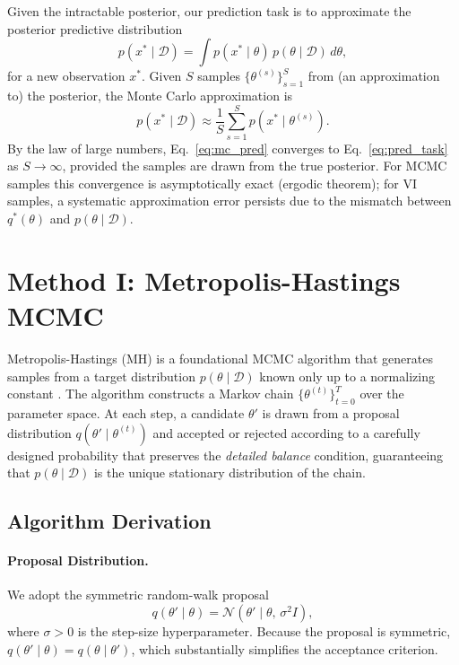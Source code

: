 \documentclass[12pt,a4paper]{article}
\newcommand{\D}{\mathcal{D}}
\newcommand{\N}{\mathcal{N}}
\begin{document}
Given the intractable posterior, our prediction task is to approximate
the posterior predictive distribution
\begin{equation}
  p(x^* \mid \D) = \int p(x^* \mid \theta)\,p(\theta \mid \D)\,d\theta,
  \label{eq:pred_task}
\end{equation}
for a new observation $x^*$.
Given $S$ samples $\{\theta^{(s)}\}_{s=1}^{S}$ from (an approximation to)
the posterior, the Monte Carlo approximation is
\begin{equation}
  p(x^* \mid \D)
  \approx \frac{1}{S}\sum_{s=1}^{S} p\!\left(x^* \mid \theta^{(s)}\right).
  \label{eq:mc_pred}
\end{equation}
By the law of large numbers, Eq.~\eqref{eq:mc_pred} converges to
Eq.~\eqref{eq:pred_task} as $S \to \infty$, provided the samples are
drawn from the true posterior.
For MCMC samples this convergence is asymptotically exact (ergodic theorem);
for VI samples, a systematic approximation error persists due to the
mismatch between $q^*(\theta)$ and $p(\theta \mid \D)$.

\section{Method I: Metropolis-Hastings MCMC}
\label{sec:mh}

Metropolis-Hastings (MH) is a foundational MCMC algorithm that generates
samples from a target distribution $p(\theta \mid \D)$ known only up to
a normalizing constant \citep{metropolis1953equation,hastings1970monte}.
The algorithm constructs a Markov chain $\{\theta^{(t)}\}_{t=0}^{T}$
over the parameter space.
At each step, a candidate $\theta'$ is drawn from a proposal
distribution $q(\theta' \mid \theta^{(t)})$ and accepted or rejected
according to a carefully designed probability that preserves the
\emph{detailed balance} condition, guaranteeing that $p(\theta \mid \D)$
is the unique stationary distribution of the chain.

\subsection{Algorithm Derivation}

\paragraph{Proposal Distribution.}
We adopt the symmetric random-walk proposal
\begin{equation}
  q(\theta' \mid \theta) = \N(\theta' \mid \theta,\, \sigma^2 I),
  \label{eq:proposal}
\end{equation}
where $\sigma > 0$ is the step-size hyperparameter.
Because the proposal is symmetric, $q(\theta' \mid \theta) = q(\theta \mid \theta')$,
which substantially simplifies the acceptance criterion.
\end{document}
